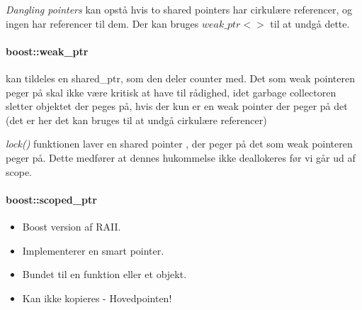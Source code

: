 \textit{Dangling pointers} kan opstå hvis to shared pointers har cirkulære referencer, og ingen har referencer til dem. Der kan bruges $weak\_ptr<>$ til at undgå dette.

\paragraph{boost::weak\_ptr}
kan tildeles en shared\_ptr, som den deler counter med.
Det som weak pointeren peger på skal ikke være kritisk at have til rådighed, idet garbage collectoren sletter objektet der peges på, hvis der kun er en weak pointer der peger på det (det er her det kan bruges til at undgå cirkulære referencer)

\textit{lock()} funktionen laver en shared pointer , der peger på det som weak pointeren peger på. Dette medfører at dennes hukommelse ikke deallokeres før vi går ud af scope.

\paragraph{boost::scoped\_ptr}
\begin{itemize}
	\item Boost version af RAII.
	\item Implementerer en smart pointer.
	\item Bundet til en funktion eller et objekt.
	\item Kan ikke kopieres - Hovedpointen!
\end{itemize}
